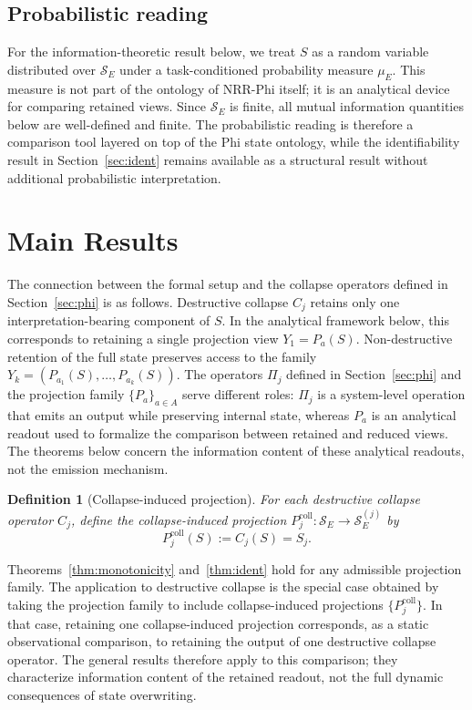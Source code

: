 \documentclass[11pt,a4paper]{article}
\newtheorem{definition}{Definition}
\begin{document}
\subsection{Probabilistic reading}

For the information-theoretic result below, we treat $S$ as a random variable distributed over $\mathcal{S}_E$ under a task-conditioned probability measure $\mu_E$. This measure is not part of the ontology of NRR-Phi \cite{saito2026phi} itself; it is an analytical device for comparing retained views. Since $\mathcal{S}_E$ is finite, all mutual information quantities below are well-defined and finite. The probabilistic reading is therefore a comparison tool layered on top of the Phi state ontology, while the identifiability result in Section~\ref{sec:ident} remains available as a structural result without additional probabilistic interpretation.

\section{Main Results}
\label{sec:results}

The connection between the formal setup and the collapse operators defined in Section~\ref{sec:phi} is as follows. Destructive collapse $C_j$ retains only one interpretation-bearing component of $S$. In the analytical framework below, this corresponds to retaining a single projection view $Y_1 = P_a(S)$. Non-destructive retention of the full state preserves access to the family $Y_k = (P_{a_1}(S), \ldots, P_{a_k}(S))$. The operators $\Pi_j$ defined in Section~\ref{sec:phi} and the projection family $\{P_a\}_{a \in A}$ serve different roles: $\Pi_j$ is a system-level operation that emits an output while preserving internal state, whereas $P_a$ is an analytical readout used to formalize the comparison between retained and reduced views. The theorems below concern the information content of these analytical readouts, not the emission mechanism.

\begin{definition}[Collapse-induced projection]
\label{def:collapse_proj}
For each destructive collapse operator $C_j$, define the collapse-induced projection $P_j^{\mathrm{coll}} : \mathcal{S}_E \to \mathcal{S}_E^{(j)}$ by
\begin{equation}
P_j^{\mathrm{coll}}(S) := C_j(S) = S_j.
\end{equation}
\end{definition}

Theorems~\ref{thm:monotonicity} and~\ref{thm:ident} hold for any admissible projection family. The application to destructive collapse is the special case obtained by taking the projection family to include collapse-induced projections $\{P_j^{\mathrm{coll}}\}$. In that case, retaining one collapse-induced projection corresponds, as a static observational comparison, to retaining the output of one destructive collapse operator. The general results therefore apply to this comparison; they characterize information content of the retained readout, not the full dynamic consequences of state overwriting.
\end{document}
